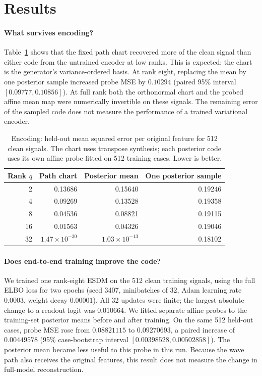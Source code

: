 \documentclass[11pt,a4paper]{article}
\begin{document}
\section{Results}
\paragraph{What survives encoding?}
Table~\ref{tab:encoding} shows that the fixed path chart recovered more of
the clean signal than either code from the untrained encoder at low ranks.
This is expected: the chart is the generator's variance-ordered basis.
At rank eight, replacing the mean by one posterior sample increased probe
MSE by $0.10294$ (paired 95\% interval $[0.09777,0.10856]$). At full rank
both the orthonormal chart and the probed affine mean map were numerically
invertible on these signals. The remaining error of the sampled code does
not measure the performance of a trained variational encoder.

\begin{table}[htbp]
\centering
\caption{Encoding: held-out mean squared error per original feature for 512
clean signals. The chart uses transpose synthesis; each posterior code uses
its own affine probe fitted on 512 training cases. Lower is better.}
\label{tab:encoding}
\begin{tabular}{@{}rrrr@{}}
\toprule
Rank $q$ & Path chart & Posterior mean & One posterior sample\\
\midrule
2  & 0.13686 & 0.15640 & 0.19246\\
4  & 0.09269 & 0.13528 & 0.19358\\
8  & 0.04536 & 0.08821 & 0.19115\\
16 & 0.01563 & 0.04326 & 0.19046\\
32 & $1.47\times10^{-30}$ & $1.03\times10^{-13}$ & 0.18102\\
\bottomrule
\end{tabular}
\end{table}

\paragraph{Does end-to-end training improve the code?}
We trained one rank-eight ESDM on the 512 clean training signals, using
the full ELBO loss for two epochs (seed 3407, minibatches of 32, Adam
learning rate $0.0003$, weight decay $0.00001$). All 32 updates were finite;
the largest absolute change to a readout logit was $0.010664$. We fitted
separate affine probes to the training-set posterior means before and after
training. On the same 512 held-out cases, probe MSE rose from $0.08821115$
to $0.09270693$, a paired increase of $0.00449578$ (95\% case-bootstrap
interval $[0.00398528,0.00502858]$). The posterior mean became less useful
to this probe in this run. Because the wave path also receives the original
features, this result does not measure the change in full-model reconstruction.
\end{document}
